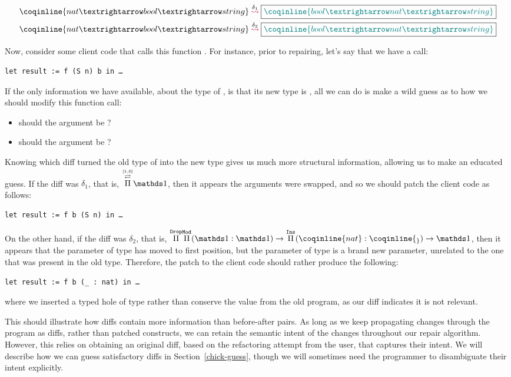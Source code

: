 \begin{align*}
\MathPatches
{\coqinline{nat → bool → string}}
{\delta_{1}}
{\coqinline{bool → nat → string}}\\
\MathPatches
{\coqinline{nat → bool → string}}
{\delta_{2}}
{\coqinline{bool → nat → string}}
\end{align*}

Now, consider some client code that calls this function .  For
instance, prior to repairing, let's say that we have a call:

\begin{verbatim}
let result := f (S n) b in …
\end{verbatim}

If the only information we have available, about the type of , is
that its new type is , all we can do is make a
wild guess as to how we should modify this function call:

\begin{itemize}
\item should the  argument be ?
\item should the  argument be ?
\end{itemize}

Knowing which diff turned the old type of  into the new type gives
us much more structural information, allowing us to make an educated guess.  If
the diff was $\delta_{1}$, that is, $\MathPermutePis{[1, 0]}{\MathSame{}}$, then
it appears the arguments were swapped, and so we should patch the client code as
follows:

\begin{verbatim}
let result := f b (S n) in …
\end{verbatim}

\noindent%
%
On the other hand, if the diff was $\delta_{2}$, that is,
$\MathDropPi{\MathModPi{\MathSame{}}{\MathSame{}}
{\MathInsPi{\coqinline{_}}{\coqinline{nat}}{\MathSame{}}}}$, then it appears
that the parameter of type  has moved to first position, but the
parameter of type  is a brand new parameter, unrelated to the one
that was present in the old type.  Therefore, the patch to the client code
should rather produce the following:

\begin{verbatim}
let result := f b (_ : nat) in …
\end{verbatim}

\noindent where we inserted a typed hole of type  rather than
conserve the value  from the old program, as our diff indicates
it is not relevant.

This should illustrate how diffs contain more information than before-after
pairs.  As long as we keep propagating changes through the program as diffs,
rather than patched constructs, we can retain the semantic intent of the changes
throughout our repair algorithm.  However, this relies on obtaining an original
diff, based on the refactoring attempt from the user, that captures their
intent.  We will describe how we can guess satisfactory diffs in
Section~\ref{chick-guess}, though we will sometimes need the programmer to
disambiguate their intent explicitly.
